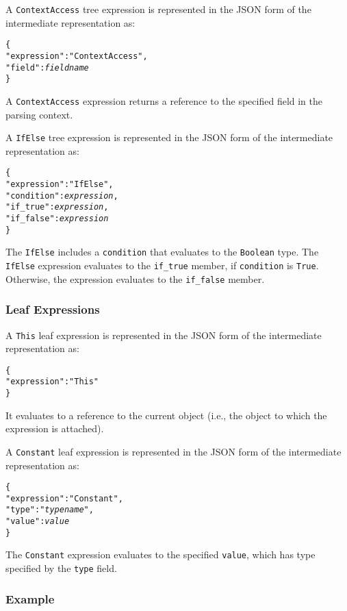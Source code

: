 \documentclass[10pt,twocolumn,a4paper]{article}
\newcommand{\code}[1]{\texttt{#1}}
\begin{document}
A \code{ContextAccess} tree expression is represented in the JSON form
of the intermediate representation as:
\footnotesize
\begin{alltt}
  \{
    "expression"  : "ContextAccess",
    "field"       : \emph{field name}
  \}
\end{alltt}
\normalsize
A \code{ContextAccess} expression returns a reference to the specified
field in the parsing context.

A \code{IfElse} tree expression is represented in the JSON form of the
intermediate representation as:
\footnotesize
\begin{alltt}
  \{
    "expression"  : "IfElse",
    "condition"   : \emph{expression},
    "if\_true"     : \emph{expression},
    "if\_false"    : \emph{expression}
  \}
\end{alltt}
\normalsize
The \code{IfElse} includes a \code{condition} that evaluates to the \code{Boolean} type.
The \code{IfElse} expression evaluates to the \code{if\_true} member, if \code{condition}
is \code{True}. Otherwise, the expression evaluates to the \code{if\_false} member.

\subsubsection{Leaf Expressions}

A \code{This} leaf expression is represented in the JSON form of the
intermediate representation as:
\footnotesize
\begin{alltt}
  \{
    "expression"   : "This"
  \}
\end{alltt}
\normalsize
It evaluates to a reference to the current object (i.e., the object to
which the expression is attached).

A \code{Constant} leaf expression is represented in the JSON form of the
intermediate representation as:
\footnotesize
\begin{alltt}
  \{
    "expression"   : "Constant",
    "type"         : "\emph{type name}",
    "value"        : \emph{value}
  \}
\end{alltt}
\normalsize
The \code{Constant} expression evaluates to the specified \code{value},
which has type specified by the \code{type} field.

\subsubsection{Example}
\end{document}

